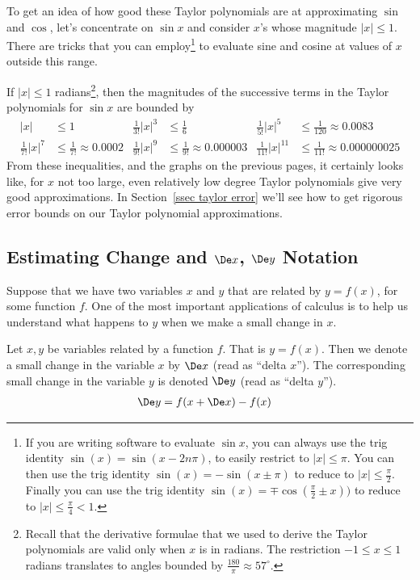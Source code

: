 To get an idea of how good these Taylor polynomials are at approximating $\sin$ and
$\cos$, let's concentrate on $\sin x$ and consider $x$'s whose magnitude $|x|\le 1$.
There are tricks that you can employ\footnote{If you are writing software to evaluate
$\sin x$, you can always use the trig identity $\sin(x)=\sin(x-2n\pi)$, to  easily
restrict to $|x|\le\pi$. You can then use the trig identity $\sin(x)=-\sin(x\pm\pi)$ to
reduce to $|x|\le\tfrac{\pi}{2}$. Finally you can use the trig identity
$\sin(x)=\mp\cos(\tfrac{\pi}{2}\pm x))$ to reduce to $|x|\le\tfrac{\pi}{4} < 1$.} to
evaluate sine and cosine at values of $x$ outside this range.

If $|x|\le 1$ radians\footnote{Recall that the derivative formulae that we used to
derive the Taylor polynomials are valid only when $x$ is in radians. The
restriction $-1 \leq x \leq 1$ radians translates to angles bounded by
$\tfrac{180}{\pi}\approx 57^\circ$.}, then the magnitudes of the successive
terms in the Taylor polynomials for $\sin x$ are bounded by
\begin{align*}
|x|&\le 1 &
\tfrac{1}{3!}|x|^3&\le\tfrac{1}{6} &
\tfrac{1}{5!}|x|^5&\le\tfrac{1}{120}\approx 0.0083 \\
\tfrac{1}{7!}|x|^7&\le\tfrac{1}{7!}\approx 0.0002 &
\tfrac{1}{9!}|x|^9&\le\tfrac{1}{9!}\approx 0.000003 &
\tfrac{1}{11!}|x|^{11}&\le\tfrac{1}{11!}\approx 0.000000025
\end{align*}
From these inequalities, and the graphs on the previous pages, it certainly looks like,
for $x$ not too large, even relatively low degree Taylor polynomials give very good
approximations. In Section~\ref{ssec taylor error} we'll see how to get rigorous error
bounds on our Taylor polynomial approximations.




\subsection{Estimating Change and $\De x$, $\De y$ Notation}
\label{ssec_est_change}


Suppose that we have two variables $x$ and $y$ that are related by $y=f(x)$, for some
function $f$. One of the most important applications of calculus is to help us understand
what happens to $y$ when we make a small change in $x$.

\begin{notn}\label{ntn_3_4_2}
 Let $x,y$ be variables related by a function $f$. That is $y = f(x)$. Then we denote a
  small change in the variable $x$ by $\De x$ (read as ``delta $x$''). The corresponding
small change in the variable $y$ is denoted $\De y$ (read as ``delta $y$'').
\begin{align*}
  \De y &= f(x+\De x) - f(x)
\end{align*}
\end{notn}

